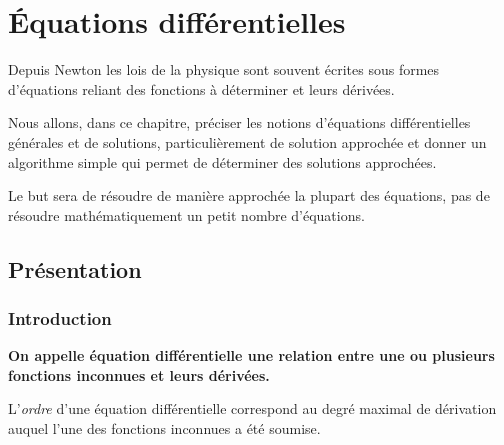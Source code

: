 \chapter{Équations différentielles}
\thispagestyle{empty}
{\sf Depuis Newton les lois de la physique sont souvent écrites sous formes d'équations reliant des fonctions à déterminer et leurs dérivées. 

Nous allons, dans ce chapitre, préciser les notions d'équations différentielles générales et de solutions, particulièrement de solution approchée et donner un algorithme simple qui permet de déterminer des solutions approchées.

Le but sera de résoudre de manière approchée la plupart des équations, pas de résoudre mathématiquement un petit nombre d'équations.
}
\section{Présentation}
\subsection{Introduction}


{\bf On appelle équation différentielle  une relation entre une ou plusieurs fonctions inconnues et leurs dérivées.} 

L'{\it ordre} d'une équation différentielle correspond au degré maximal de dérivation auquel l'une des fonctions inconnues a été soumise. 

